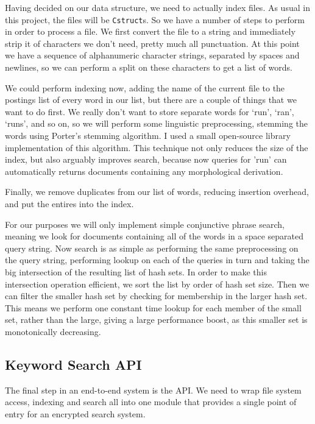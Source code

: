 \documentclass[12pt,a4paper,twoside,openright]{report}
\begin{document}
Having decided on our data structure, we need to actually index files. As usual in this project, the files will be \texttt{Cstruct}s. So we have a number of steps to perform in order to process a file. We first convert the file to a string and immediately strip it of characters we don't need, pretty much all punctuation. At this point we have a sequence of alphanumeric character strings, separated by spaces and newlines, so we can perform a split on these characters to get a list of words.

We could perform indexing now, adding the name of the current file to the postings list of every word in our list, but there are a couple of things that we want to do first. We really don't want to store separate words for `run', `ran', `runs', and so on, so we will perform some linguistic preprocessing, stemming the words using Porter's stemming algorithm. I used a small open-source library implementation of this algorithm. This technique not only reduces the size of the index, but also arguably improves search, because now queries for 'run' can automatically returns documents containing any morphological derivation.

Finally, we remove duplicates from our list of words, reducing insertion overhead, and put the entires into the index.

For our purposes we will only implement simple conjunctive phrase search, meaning we look for documents containing all of the words in a space separated query string. Now search is as simple as performing the same preprocessing on the query string, performing lookup on each of the queries in turn and taking the big intersection of the resulting list of hash sets. In order to make this intersection operation efficient, we sort the list by order of hash set size. Then we can filter the smaller hash set by checking for membership in the larger hash set. This means we perform one constant time lookup for each member of the small set, rather than the large, giving a large performance boost, as this smaller set is monotonically decreasing.

\subsection{Keyword Search API}
\label{subsec:searchapi}

The final step in an end-to-end system is the API. We need to wrap file system access, indexing and search all into one module that provides a single point of entry for an encrypted search system.
\end{document}
